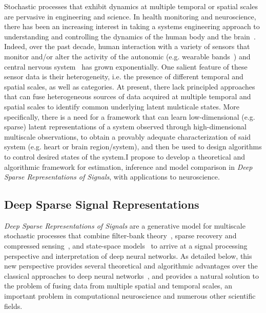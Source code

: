 \documentclass[12pt]{article}
\begin{document}
Stochastic processes that exhibit dynamics at multiple temporal or spatial
scales are pervasive in engineering and science. In health monitoring and neuroscience, there has been an increasing interest in taking a systems engineering approach to understanding and controlling the dynamics of the human body and the brain~\cite{kim2011epidermal2,liberman2013closed}. Indeed, over the past decade, human interaction with a variety of sensors that monitor and/or alter the activity of the autonomic (e.g. wearable bands~\cite{savage2015mobile}) and central nervous system~\cite{sejnowski2014putting} has grown exponentially. One salient feature of these sensor data is their heterogeneity, i.e. the presence of different temporal and spatial scales, as well as categories. At present, there lack principled approaches that
can fuse heterogeneous sources of data acquired at multiple temporal and spatial scales to identify
common underlying latent mulsticale states. More specifically, there is a need for a framework that can learn low-dimensional (e.g. sparse) latent representations of a system observed through high-dimensional multiscale observations, to obtain a provably adequate characterization of said system (e.g. heart or brain region/system), and then be used to design algorithms to control desired states of the system.I propose to develop a theoretical and algorithmic framework for estimation, inference and model comparison in \emph{Deep Sparse Representations of Signals}, with applications to neuroscience. 

\subsection*{Deep Sparse Signal Representations}

\emph{Deep Sparse Representations of Signals} are a generative model for multiscale stochastic processes that combine filter-bank theory~\cite{fliege1994multirate,strang1996wavelets,daubechies1992ten}, sparse recovery and compressed sensing~\cite{donoho2006compressed,candes2008introduction}, and state-space models~\cite{Ba:12,ba2013b} to arrive at a signal processing perspective and interpretation of deep neural networks. As detailed below, this new perspective provides several theoretical and algorithmic advantages over the classical approaches to deep neural networks~\cite{lecun2015deep}, and provides a natural solution to the problem of fusing data from multiple spatial and temporal scales, an important problem in computational neuroscience and numerous other scientific fields.
\end{document}
